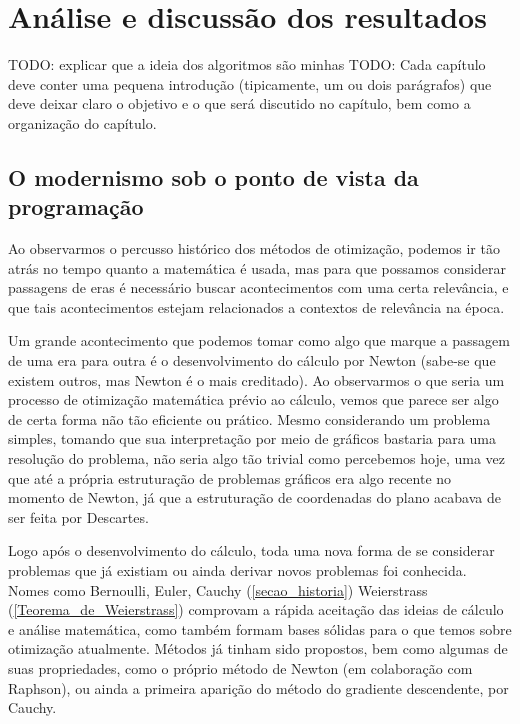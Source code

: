 
\chapter{\larger Análise e discussão dos resultados}


TODO: explicar que a ideia dos algoritmos são minhas
TODO: Cada capítulo deve conter uma pequena introdução (tipicamente, um ou dois parágrafos) que deve deixar claro o objetivo e o que será discutido no capítulo, bem como a organização do capítulo.


\section{O modernismo sob o ponto de vista da programação}
Ao observarmos o percusso histórico dos métodos de otimização, podemos ir tão atrás no tempo
quanto a matemática é usada, mas para que possamos considerar passagens de eras é necessário
buscar acontecimentos com uma certa relevância, e que tais acontecimentos estejam relacionados
a contextos de relevância na época.

Um grande acontecimento que podemos tomar como algo que marque a passagem de uma era para
outra é o desenvolvimento do cálculo por Newton (sabe-se que existem outros, mas Newton é
o mais creditado). Ao observarmos o que seria um processo de otimização matemática prévio
ao cálculo, vemos que parece ser algo de certa forma não tão eficiente ou prático. Mesmo
considerando um problema simples, tomando que sua interpretação por meio de gráficos bastaria
para uma resolução do problema, não seria algo tão trivial como percebemos hoje, uma vez
que até a própria estruturação de problemas gráficos era algo recente no momento de Newton,
já que a estruturação de coordenadas do plano acabava de ser feita por Descartes.

Logo após o desenvolvimento do cálculo, toda uma nova forma de se considerar problemas
que já existiam ou ainda derivar novos problemas foi conhecida. Nomes como Bernoulli, Euler,
Cauchy (\ref{secao_historia}) Weierstrass (\ref{Teorema_de_Weierstrass}) comprovam a rápida
aceitação das ideias de cálculo e análise matemática, como também formam bases sólidas para
o que temos sobre otimização atualmente. Métodos já tinham sido propostos, bem como algumas
de suas propriedades, como o próprio método de Newton (em colaboração com Raphson), ou ainda
a primeira aparição do método do gradiente descendente, por Cauchy.

